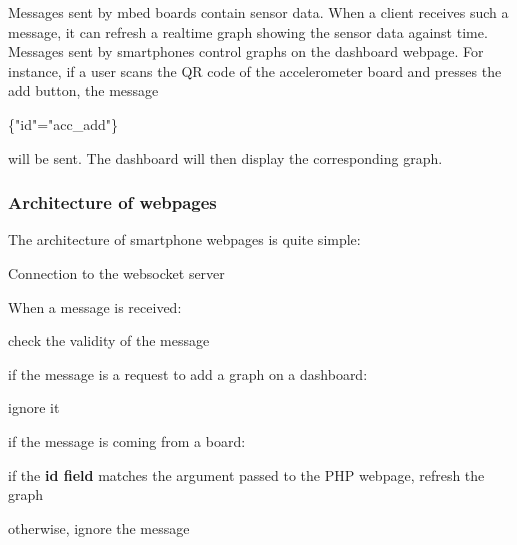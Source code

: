 \documentclass[pdftex,10pt,a4paper]{report}
\newenvironment{packed_item}{
\begin{itemize}
  \setlength{\itemsep}{1pt}
  \setlength{\parskip}{0pt}
  \setlength{\parsep}{0pt}
}{\end{itemize}}
\begin{document}
Messages sent by mbed boards contain sensor data. When a client receives such a message, it can refresh a realtime graph showing the sensor data against time. \\
Messages sent by smartphones control graphs on the dashboard webpage. For instance, if a user scans the QR code of the accelerometer board and presses the add button, the message 
		\begin{center}
				\{"id"="acc\_add"\}
		\end{center}
will be sent. The dashboard will then display the corresponding graph. \\

\subsubsection{Architecture of webpages}
The architecture of smartphone webpages is quite simple:
\begin{packed_item}
	\item Connection to the websocket server
	\item When a message is received:
		\begin{packed_item}
			\item check the validity of the message
			\item if the message is a request to add a graph on a dashboard:
			\begin{packed_item}
				\item ignore it
			\end{packed_item}
			\item if the message is coming from a board:
					\begin{packed_item}
						\item if the \textbf{id field} matches the argument passed to the PHP webpage, refresh the graph
						\item otherwise, ignore the message
					\end{packed_item}
		\end{packed_item}
\end{packed_item}
\end{document}
